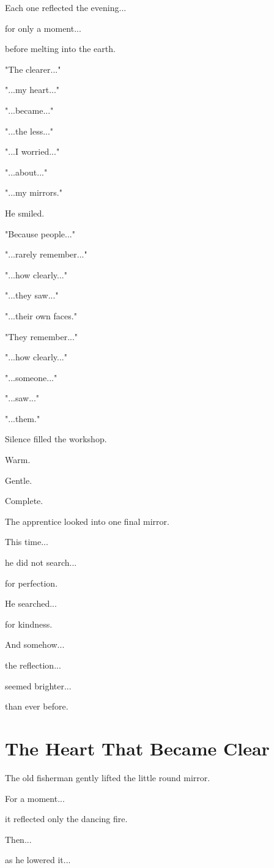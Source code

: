 \documentclass[12pt,openany]{book}
\begin{document}
Each one reflected the evening...

for only a moment...

before melting into the earth.

"The clearer..."

"...my heart..."

"...became..."

"...the less..."

"...I worried..."

"...about..."

"...my mirrors."

He smiled.

"Because people..."

"...rarely remember..."

"...how clearly..."

"...they saw..."

"...their own faces."

"They remember..."

"...how clearly..."

"...someone..."

"...saw..."

"...them."

Silence filled the workshop.

Warm.

Gentle.

Complete.

The apprentice looked into one final mirror.

This time...

he did not search...

for perfection.

He searched...

for kindness.

And somehow...

the reflection...

seemed brighter...

than ever before.
\section*{The Heart That Became Clear}

The old fisherman gently lifted the little round mirror.

For a moment...

it reflected only the dancing fire.

Then...

as he lowered it...
\end{document}
